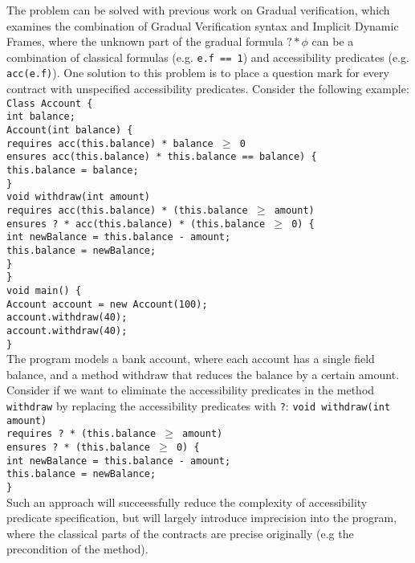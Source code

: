 \documentclass {article}
\begin{document}
The problem can be solved with previous work on Gradual verification, which examines the combination of Gradual Verification syntax and Implicit Dynamic Frames, where the unknown part of the gradual formula $? * \phi$ can be a combination of classical formulas (e.g. \texttt{e.f == 1}) and accessibility predicates (e.g. \texttt{acc(e.f)}). One solution to this problem is to place a question mark for every contract with unspecified accessibility predicates.  Consider the following example:\\
\texttt{\noindent Class Account \{  \\
\setlength\parindent{24pt}
\indent int balance;\\
\indent Account(int balance) \{\\
\indent \indent requires acc(this.balance) * balance $\geq$ 0\\
\indent \indent ensures acc(this.balance) *  this.balance == balance) \{\\
\indent \indent this.balance = balance;\\
\indent \}\\
\indent void withdraw(int amount) \\
\indent \indent requires acc(this.balance) * (this.balance $\geq$ amount)\\
\indent \indent ensures ? * acc(this.balance) *  (this.balance $\geq$ 0) \{\\
\indent \indent int newBalance = this.balance - amount;\\
\indent \indent this.balance = newBalance; \\
\indent \}\\
\} \\
void main() \{ \\
\indent Account account = new Account(100);\\
\indent account.withdraw(40);\\
\indent account.withdraw(40);\\
\} \\
}
\setlength\parindent{0pt}
The program models a bank account, where each account has a single field balance, and a method withdraw that reduces the balance by a certain amount. Consider if we want to eliminate the accessibility predicates in the method \texttt{withdraw} by replacing the accessibility predicates with \texttt{?}:
\texttt{void withdraw(int amount) \\
\setlength\parindent{24pt}
\indent requires ? * (this.balance $\geq$ amount)\\
\indent ensures ? *  (this.balance $\geq$ 0) \{\\
\indent int newBalance = this.balance - amount;\\
\indent this.balance = newBalance; \\
\}\\
}
\setlength\parindent{0pt}
Such an approach will succeessfully reduce the complexity of accessibility predicate specification, but will largely introduce imprecision into the program, where the classical parts of the contracts are precise originally (e.g the precondition of the method).\\
\end{document}
